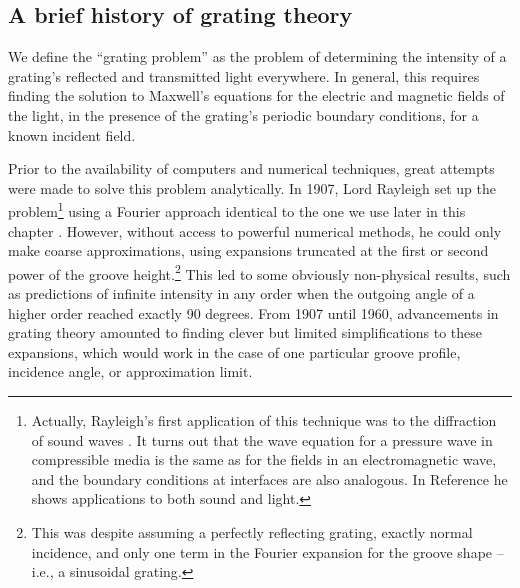 \subsection{A brief history of grating theory}

We define the ``grating problem'' as the problem of determining the intensity of a grating's reflected and transmitted light everywhere.  In general, this requires finding the solution to Maxwell's equations for the electric and magnetic fields of the light, in the presence of the grating's periodic boundary conditions, for a known incident field.  

Prior to the availability of computers and numerical techniques, great attempts were made to solve this problem analytically.  In 1907, Lord Rayleigh set up the problem\footnote{Actually, Rayleigh's first application of this technique was to the diffraction of sound waves \cite{Ray86}.  It turns out that the wave equation for a pressure wave in compressible media is the same as for the fields in an electromagnetic wave, and the boundary conditions at interfaces are also analogous. In Reference \cite{Ray07} he shows applications to both sound and light.} using a Fourier approach identical to the one we use later in this chapter \cite{Ray07}.  However, without access to powerful numerical methods, he could only make coarse approximations, using expansions truncated at the first or second power of the groove height.\footnote{This was despite assuming a perfectly reflecting grating, exactly normal incidence, and only one term in the Fourier expansion for the groove shape -- i.e., a sinusoidal grating.}  This led to some obviously non-physical results, such as predictions of infinite intensity in any order when the outgoing angle of a higher order reached exactly 90 degrees.  From 1907 until 1960, advancements in grating theory amounted to finding clever but limited simplifications to these expansions, which would work in the case of one particular groove profile, incidence angle, or approximation limit.

